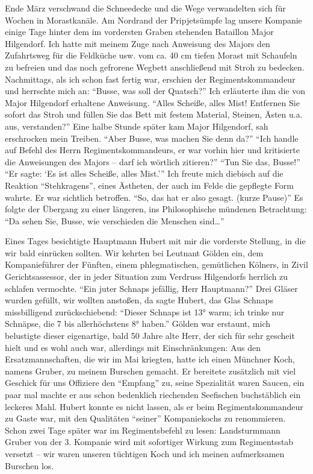 Ende März verschwand die Schneedecke und die Wege verwandelten sich für Wochen in Morastkanäle. Am Nordrand der Pripjetsümpfe lag unsere Kompanie einige Tage hinter dem im vordersten Graben stehenden Bataillon Major Hilgendorf. Ich hatte mit meinem Zuge nach Anweisung des Majors den Zufahrtsweg für die Feldküche usw. vom ca. 40 cm tiefen Morast mit Schaufeln zu befreien und das noch gefrorene Wegbett anschließend mit Stroh zu bedecken. Nachmittags, als ich schon fast fertig war, erschien der Regimentskommandeur und herrschte mich an: \enquote{Busse, was soll der Quatsch?} Ich erläuterte ihm die von Major Hilgendorf erhaltene Anweisung. \enquote{Alles Scheiße, alles Mist! Entfernen Sie sofort das Stroh und füllen Sie das Bett mit festem Material, Steinen, Ästen u.a. aus, verstanden?} Eine halbe Stunde später kam Major Hilgendorf, sah erschrocken mein Treiben. \enquote{Aber Busse, was machen Sie denn da?} \enquote{Ich handle auf Befehl des Herrn Regimentskommandeurs, er war vorhin hier und kritisierte die Anweisungen des Majors -- darf ich wörtlich zitieren?} \enquote{Tun Sie das, Busse!} \enquote{Er sagte: \enquote{Es ist alles Scheiße, alles Mist.}} Ich freute mich diebisch auf die Reaktion \enquote{Stehkragens}, eines Ästheten, der auch im Felde die gepflegte Form wahrte. Er war sichtlich betroffen. \enquote{So, das hat er also gesagt. (kurze Pause)} Es folgte der Übergang zu einer längeren, ins Philosophische mündenen Betrachtung: \enquote{Da sehen Sie, Busse, wie verschieden die Menschen sind\dots}

Eines Tages besichtigte Hauptmann Hubert mit mir die vorderste Stellung, in die wir bald einrücken sollten. Wir kehrten bei Leutnant Gölden ein, dem Kompanieführer der Fünften, einem phlegmatischen, gemütlichen Kölners, in Zivil Gerichtsassessor, der in jeder Situation zum Verdruss Hilgendorfs herrlich zu schlafen vermochte. \enquote{Ein juter Schnaps jefällig, Herr Hauptmann?} Drei Gläser wurden gefüllt, wir wollten anstoßen, da sagte Hubert, das Glas Schnaps missbilligend zurückschiebend: \enquote{Dieser Schnaps ist 13° warm; ich trinke nur Schnäpse, die 7 bis allerhöchstens 8° haben.} Gölden war erstaunt, mich belustigte dieser eigenartige, bald 50 Jahre alte Herr, der sich für sehr gescheit hielt und es wohl auch war, allerdings mit Einschränkungen: Aus den Ersatzmannschaften, die wir im Mai kriegten, hatte ich einen Münchner Koch, namens Gruber, zu meinem Burschen gemacht. Er bereitete zusätzlich mit viel Geschick für uns Offiziere den \enquote{Empfang} zu, seine Spezialität waren Saucen, ein paar mal machte er aus schon bedenklich riechenden Seefischen buchstäblich ein leckeres Mahl. Hubert konnte es nicht lassen, als er beim Regimentskommandeur zu Gaste war, mit den Qualitäten \enquote{seiner} Kompaniekochs zu renommieren. Schon zwei Tage später war im Regimentsbefehl zu lesen: Landsturmmann Gruber von der 3. Kompanie wird mit sofortiger Wirkung zum Regimentsstab versetzt -- wir waren unseren tüchtigen Koch und ich meinen aufmerksamen Burschen los.


